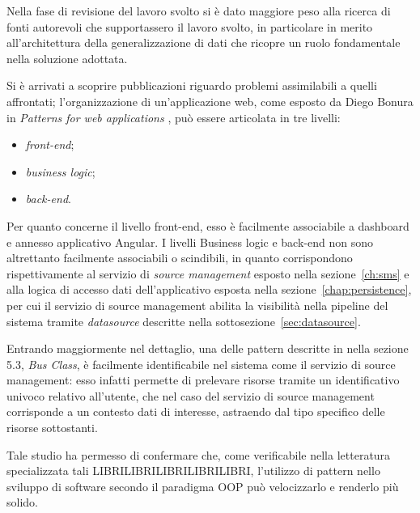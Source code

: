 
Nella fase di revisione del lavoro svolto si è dato maggiore peso alla ricerca di fonti autorevoli che supportassero il lavoro svolto, in particolare in merito all'architettura della generalizzazione di dati che ricopre un ruolo fondamentale nella soluzione adottata.

Si è arrivati a scoprire pubblicazioni riguardo problemi assimilabili a quelli affrontati; l'organizzazione di un'applicazione web, come esposto da Diego Bonura in \textit{Patterns for web applications} \cite{DBLP:conf/seke/BonuraCM02}, può essere articolata in tre livelli:
\begin{itemize}
\item
\textit{front-end};
\item
\textit{business logic};
\item
\textit{back-end}.
\end{itemize}

Per quanto concerne il livello front-end, esso è facilmente associabile a dashboard e annesso applicativo Angular.
I livelli Business logic e back-end non sono altrettanto facilmente associabili o scindibili, in quanto corrispondono rispettivamente al servizio di \textit{source management} esposto nella sezione~\ref{ch:sms} e alla logica di accesso dati dell'applicativo esposta nella sezione~\ref{chap:persistence}, per cui il servizio di source management abilita la visibilità nella pipeline del sistema tramite \textit{datasource} descritte nella sottosezione~\ref{sec:datasource}.

Entrando maggiormente nel dettaglio, una delle pattern descritte in \cite{DBLP:conf/seke/BonuraCM02} nella sezione 5.3, \textit{Bus Class}, è facilmente identificabile nel sistema come il servizio di source management: esso infatti permette di prelevare risorse tramite un identificativo univoco relativo all'utente, che nel caso del servizio di source management corrisponde a un contesto dati di interesse, astraendo dal tipo specifico delle risorse sottostanti.

Tale studio ha permesso di confermare che, come verificabile nella letteratura specializzata tali LIBRILIBRILIBRILIBRILIBRI, l'utilizzo di pattern nello sviluppo di software secondo il paradigma OOP può velocizzarlo e renderlo più solido.


